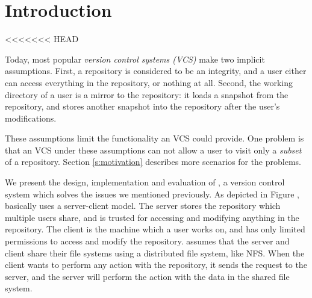 \section{Introduction}
\label{s:intro}

<<<<<<< HEAD
\newcommand{\git} {Git}
\newcommand{\nfs} {NFS}

Today, most popular  \emph{version control
systems (VCS)} make two implicit assumptions. First, a repository is considered to be
an integrity, and a user either can access everything in the repository, or
nothing at all. Second, the working directory of a user is a mirror to the
repository: it loads a snapshot from the repository, and stores another snapshot
into the repository after the user's modifications. 

These assumptions limit the functionality an VCS could provide.
One problem is that an VCS under these assumptions can not allow a user to
visit only a \emph{subset} of a repository. Section \ref{s:motivation} describes
more scenarios for the problems.


We present the design, implementation and evaluation of \sys, a version control
system which solves the issues we mentioned previously. As depicted in Figure
, \sys basically
uses a server-client model. The server stores the repository which multiple
users share, and is trusted for accessing and modifying anything in the
repository. The client is the machine which a user works on, and has only
limited permissions to access and modify the repository. \sys assumes that the
server and client share their file systems using a distributed file system, like
\nfs. %
When the client wants to perform any action with the repository, it sends the
request to the server, and the server will perform the action with the data in
the shared file system. 

